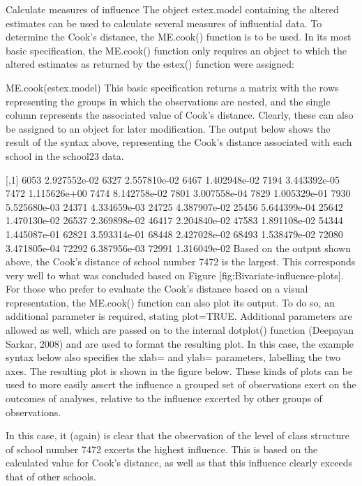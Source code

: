 Calculate measures of influence
The object estex.model containing the altered estimates can be used to calculate several measures of influential data. To determine the Cook's distance, the ME.cook() function is to be used. In its most basic specification, the ME.cook() function only requires an object to which the altered estimates as returned by the estex() function were assigned:

ME.cook(estex.model) 
This basic specification returns a matrix with the rows representing the groups in which the observations are nested, and the single column represents the associated value of Cook's distance. Clearly, these can also be assigned to an object for later modification. The output below shows the result of the syntax above, representing the Cook's distance associated with each school in the school23 data.

              [,1]
6053  2.927552e-02
6327  2.557810e-02
6467  1.402948e-02
7194  3.443392e-05
7472  1.115626e+00
7474  8.142758e-02
7801  3.007558e-04
7829  1.005329e-01
7930  5.525680e-03
24371 4.334659e-03
24725 4.387907e-02
25456 5.644399e-04
25642 1.470130e-02
26537 2.369898e-02
46417 2.204840e-02
47583 1.891108e-02
54344 1.445087e-01
62821 3.593314e-01
68448 2.427028e-02
68493 1.538479e-02
72080 3.471805e-04
72292 6.387956e-03
72991 1.316049e-02
Based on the output shown above, the Cook's distance of school number 7472 is the largest. This corresponds very well to what was concluded based on Figure [fig:Bivariate-influence-plots]. For those who prefer to evaluate the Cook's distance based on a visual representation, the ME.cook() function can also plot its output. To do so, an additional parameter is required, stating plot=TRUE. Additional parameters are allowed as well, which are passed on to the internal dotplot() function (Deepayan Sarkar, 2008) and are used to format the resulting plot. In this case, the example syntax below also specifies the xlab= and ylab= parameters, labelling the two axes. The resulting plot is shown in the figure below. These kinds of plots can be used to more easily assert the influence a grouped set of observations exert on the outcomes of analyses, relative to the influence excerted by other groups of observations.

In this case, it (again) is clear that the observation of the level of class structure of school number 7472 excerts the highest influence. This is based on the calculated value for Cook's distance, as well as that this influence clearly exceeds that of other schools.

